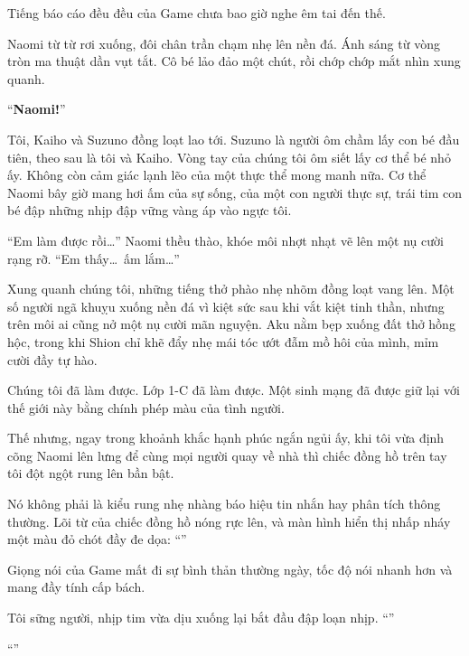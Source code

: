 \documentclass[../main.tex]{subfiles}
\begin{document}
Tiếng báo cáo đều đều của Game chưa bao giờ nghe êm tai đến thế.

Naomi từ từ rơi xuống, đôi chân trần chạm nhẹ lên nền đá. Ánh sáng từ vòng tròn ma thuật dần vụt tắt. Cô bé lảo đảo một chút, rồi chớp chớp mắt nhìn xung quanh.

``\textbf{Naomi!}''

Tôi, Kaiho và Suzuno đồng loạt lao tới. Suzuno là người ôm chầm lấy con bé đầu tiên, theo sau là tôi và Kaiho. Vòng tay của chúng tôi ôm siết lấy cơ thể bé nhỏ ấy. Không còn cảm giác lạnh lẽo của một thực thể mong manh nữa. Cơ thể Naomi bây giờ mang hơi ấm của sự sống, của một con người thực sự, trái tim con bé đập những nhịp đập vững vàng áp vào ngực tôi.

``Em làm được rồi\dots'' Naomi thều thào, khóe môi nhợt nhạt vẽ lên một nụ cười rạng rỡ. ``Em thấy\dots\ ấm lắm\dots''

Xung quanh chúng tôi, những tiếng thở phào nhẹ nhõm đồng loạt vang lên. Một số người ngã khuỵu xuống nền đá vì kiệt sức sau khi vắt kiệt tinh thần, nhưng trên môi ai cũng nở một nụ cười mãn nguyện. Aku nằm bẹp xuống đất thở hồng hộc, trong khi Shion chỉ khẽ đẩy nhẹ mái tóc ướt đẫm mồ hôi của mình, mỉm cười đầy tự hào.

Chúng tôi đã làm được. Lớp 1-C đã làm được. Một sinh mạng đã được giữ lại với thế giới này bằng chính phép màu của tình người.

Thế nhưng, ngay trong khoảnh khắc hạnh phúc ngắn ngủi ấy, khi tôi vừa định cõng Naomi lên lưng để cùng mọi người quay về nhà thì chiếc đồng hồ trên tay tôi đột ngột rung lên bần bật.

Nó không phải là kiểu rung nhẹ nhàng báo hiệu tin nhắn hay phân tích thông thường. Lõi từ của chiếc đồng hồ nóng rực lên, và màn hình hiển thị nhấp nháy một màu đỏ chót đầy đe dọa: ``''

Giọng nói của Game mất đi sự bình thản thường ngày, tốc độ nói nhanh hơn và mang đầy tính cấp bách.

Tôi sững người, nhịp tim vừa dịu xuống lại bắt đầu đập loạn nhịp. ``''

``''
\end{document}
